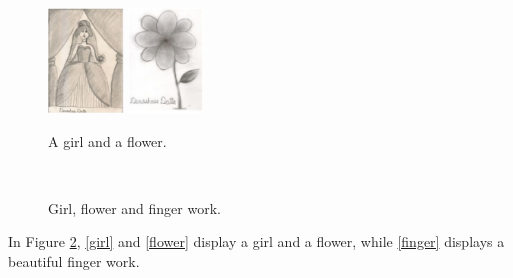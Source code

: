 \documentclass[a4paper]{article}
\begin{document}
\begin{figure}[!hbt]
    \centering
    \includegraphics[width=2.0cm]{girl}\hfill
    \includegraphics[width=2.0cm]{flower}
    \caption{A girl and a flower.}
    \label{girl_flower}
    \end{figure}
    

    \begin{figure}[!htb]
    \centering
    \hfill
    \\
    \caption{Girl, flower and finger work.}
    \label{girl_flower_finger}
    \end{figure}
    In Figure \ref{girl_flower_finger}, \ref{girl}
    and \ref{flower} display a girl and a flower,
    while \ref{finger} displays a beautiful finger
    work.
\end{document}
